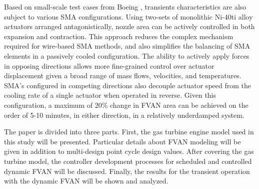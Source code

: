 Based on small-scale test cases from Boeing \cite{Mabe:2008,Mabe:2008:Paris},
transients characteristics are also subject to various SMA configurations.
Using two-sets of monolithic Ni-40ti alloy actuators arranged antagonistically,
nozzle area can be actively controlled in both expansion and contraction. This
approach reduces the complex mechanism required for wire-based SMA methods,
and also simplifies the balancing of SMA elements in a passively cooled
configuration. The ability to actively apply forces in opposing directions
allows more fine-grained control over actuator displacement given a broad range
of mass flows, velocities, and temperatures. SMA's configured in competing
directions also decouple actuator speed from the cooling rate of a single
actuator when operated in reverse. Given this configuration, a maximum of 20\%
change in FVAN area can be achieved on the order of 5-10 minutes, in either
direction, in a relatively underdamped system.

The paper is divided into three parts. First, the gas turbine engine model used in this study will be presented. Particular details about FVAN modeling will be given in addition to multi-design point cycle design values. After covering the gas turbine model, the controller development processes for scheduled and controlled dynamic FVAN will be discussed. Finally, the results for the transient operation with the dynamic FVAN will be shown and analyzed. 